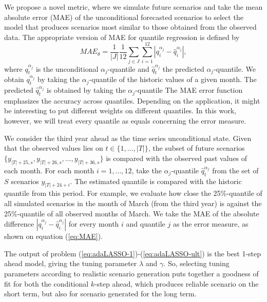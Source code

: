 We propose a novel metric, where we simulate future scenarios and take the mean absolute error (MAE) of the unconditional forecasted scenarios to select the model that produces scenarios most similar to those obtained from the observed data.
The appropriate version of MAE for quantile regression is defined by
\begin{equation}
MAE_{\theta}= \frac{1}{|J|} \frac{1}{12} \sum_{j \in J} \sum_{i = 1}^{12}  \left| q_i^{\alpha_{j}}- \hat q_i^{\alpha_{j}}  \right|,
\label{eq:MAE}
\end{equation}
where $q_t^{\alpha_{j}}$ is the unconditional $\alpha_j$-quantile  and $\hat q_t^{\alpha_j}$ the predicted $\alpha_j$-quantile. We obtain $q_t^{\alpha_j}$ by taking the $\alpha_j$-quantile of the historic values of a given month. The predicted $\hat q_t^{\alpha_j}$ is obtained by taking the $\alpha_j$-quantile 
The MAE error function emphasizes the accuracy across quantiles. Depending on the application, it might be interesting to put different weights on different quantiles. In this work, however, we will treat every quantile as equals concerning the error measure.

We consider the third year ahead as the time series unconditional state. Given that the observed values lies on $t \in \{1,\dots,|T| \}$, the subset of future scenarios $\{y_{|T|+25,s}, y_{|T|+26,s}, \dots, y_{|T|+36,s} \}$ is compared with the observed past values of each month. 
For each month $i = 1,\dots, 12$, take the $\alpha_j$-quantile $\hat q_t^{\alpha_j}$ from the set of $S$ scenarios $y_{|T|+24+i}$. The estimated quantile is compared with the historic quantile from this period. For example, we evaluate how close the 25\%-quantile
of all simulated scenarios in the month of March (from the third year) is against the 25\%-quantile
of all observed months of March. We take the MAE of the absolute difference $\left| q_i^{\alpha_{j}}- \hat q_i^{\alpha_{j}}  \right|$ for every month $i$ and quantile $j$ as the error measure, as shown on equation (\ref{eq:MAE}).

The output of problem (\ref{eq:adaLASSO-1})-(\ref{eq:adaLASSO-ult}) is the best 1-step ahead model, giving the tuning parameter $\lambda$ and $\gamma$. 
So, selecting tuning parameters according to realistic scenario generation puts together a goodness of fit for both the conditional $k$-step ahead, which produces reliable scenario on the short term, but also for scenario generated for the long term.  








